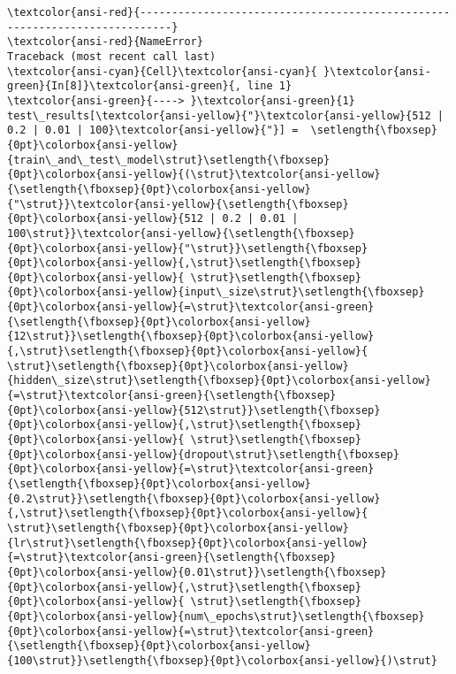 \documentclass[11pt]{article}
\begin{document}
    \begin{Verbatim}[commandchars=\\\{\}, frame=single, framerule=2mm, rulecolor=\color{outerrorbackground}]
\textcolor{ansi-red}{---------------------------------------------------------------------------}
\textcolor{ansi-red}{NameError}                                 Traceback (most recent call last)
\textcolor{ansi-cyan}{Cell}\textcolor{ansi-cyan}{ }\textcolor{ansi-green}{In[8]}\textcolor{ansi-green}{, line 1}
\textcolor{ansi-green}{----> }\textcolor{ansi-green}{1} test\_results[\textcolor{ansi-yellow}{"}\textcolor{ansi-yellow}{512 | 0.2 | 0.01 | 100}\textcolor{ansi-yellow}{"}] =  \setlength{\fboxsep}{0pt}\colorbox{ansi-yellow}{train\_and\_test\_model\strut}\setlength{\fboxsep}{0pt}\colorbox{ansi-yellow}{(\strut}\textcolor{ansi-yellow}{\setlength{\fboxsep}{0pt}\colorbox{ansi-yellow}{"\strut}}\textcolor{ansi-yellow}{\setlength{\fboxsep}{0pt}\colorbox{ansi-yellow}{512 | 0.2 | 0.01 | 100\strut}}\textcolor{ansi-yellow}{\setlength{\fboxsep}{0pt}\colorbox{ansi-yellow}{"\strut}}\setlength{\fboxsep}{0pt}\colorbox{ansi-yellow}{,\strut}\setlength{\fboxsep}{0pt}\colorbox{ansi-yellow}{ \strut}\setlength{\fboxsep}{0pt}\colorbox{ansi-yellow}{input\_size\strut}\setlength{\fboxsep}{0pt}\colorbox{ansi-yellow}{=\strut}\textcolor{ansi-green}{\setlength{\fboxsep}{0pt}\colorbox{ansi-yellow}{12\strut}}\setlength{\fboxsep}{0pt}\colorbox{ansi-yellow}{,\strut}\setlength{\fboxsep}{0pt}\colorbox{ansi-yellow}{ \strut}\setlength{\fboxsep}{0pt}\colorbox{ansi-yellow}{hidden\_size\strut}\setlength{\fboxsep}{0pt}\colorbox{ansi-yellow}{=\strut}\textcolor{ansi-green}{\setlength{\fboxsep}{0pt}\colorbox{ansi-yellow}{512\strut}}\setlength{\fboxsep}{0pt}\colorbox{ansi-yellow}{,\strut}\setlength{\fboxsep}{0pt}\colorbox{ansi-yellow}{ \strut}\setlength{\fboxsep}{0pt}\colorbox{ansi-yellow}{dropout\strut}\setlength{\fboxsep}{0pt}\colorbox{ansi-yellow}{=\strut}\textcolor{ansi-green}{\setlength{\fboxsep}{0pt}\colorbox{ansi-yellow}{0.2\strut}}\setlength{\fboxsep}{0pt}\colorbox{ansi-yellow}{,\strut}\setlength{\fboxsep}{0pt}\colorbox{ansi-yellow}{ \strut}\setlength{\fboxsep}{0pt}\colorbox{ansi-yellow}{lr\strut}\setlength{\fboxsep}{0pt}\colorbox{ansi-yellow}{=\strut}\textcolor{ansi-green}{\setlength{\fboxsep}{0pt}\colorbox{ansi-yellow}{0.01\strut}}\setlength{\fboxsep}{0pt}\colorbox{ansi-yellow}{,\strut}\setlength{\fboxsep}{0pt}\colorbox{ansi-yellow}{ \strut}\setlength{\fboxsep}{0pt}\colorbox{ansi-yellow}{num\_epochs\strut}\setlength{\fboxsep}{0pt}\colorbox{ansi-yellow}{=\strut}\textcolor{ansi-green}{\setlength{\fboxsep}{0pt}\colorbox{ansi-yellow}{100\strut}}\setlength{\fboxsep}{0pt}\colorbox{ansi-yellow}{)\strut}


\end{Verbatim}
\end{document}
